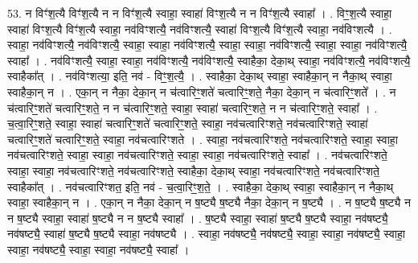 \documentclass[17pt]{extarticle}
\begin{document}
53. न विꣳ॑श॒त्यै विꣳ॑श॒त्यै न न विꣳ॑श॒त्यै स्वाहा॒ स्वाहा॑ विꣳश॒त्यै न न विꣳ॑श॒त्यै स्वाहा᳚ । . विꣳ॒॒श॒त्यै स्वाहा॒ स्वाहा॑ विꣳश॒त्यै विꣳ॑श॒त्यै स्वाहा॒ नव॑विꣳशत्यै॒ नव॑विꣳशत्यै॒ स्वाहा॑ विꣳश॒त्यै विꣳ॑श॒त्यै स्वाहा॒ नव॑विꣳशत्यै । . स्वाहा॒ नव॑विꣳशत्यै॒ नव॑विꣳशत्यै॒ स्वाहा॒ स्वाहा॒ नव॑विꣳशत्यै॒ स्वाहा॒ स्वाहा॒ नव॑विꣳशत्यै॒ स्वाहा॒ स्वाहा॒ नव॑विꣳशत्यै॒ स्वाहा᳚ । . नव॑विꣳशत्यै॒ स्वाहा॒ स्वाहा॒ नव॑विꣳशत्यै॒ नव॑विꣳशत्यै॒ स्वाहैका॒ देका॒थ् स्वाहा॒ नव॑विꣳशत्यै॒ नव॑विꣳशत्यै॒ स्वाहैका᳚त् । . नव॑विꣳशत्या॒ इति॒ नव॑ - विꣳ॒॒श॒त्यै॒ । . स्वाहैका॒ देका॒थ् स्वाहा॒ स्वाहैका॒न् न नैका॒थ् स्वाहा॒ स्वाहैका॒न् न । . एका॒न् न नैका॒ देका॒न् न च॑त्वारिꣳ॒॒शते॑ चत्वारिꣳ॒॒शते॒ नैका॒ देका॒न् न च॑त्वारिꣳ॒॒शते᳚ । . न च॑त्वारिꣳ॒॒शते॑ चत्वारिꣳ॒॒शते॒ न न च॑त्वारिꣳ॒॒शते॒ स्वाहा॒ स्वाहा॑ चत्वारिꣳ॒॒शते॒ न न च॑त्वारिꣳ॒॒शते॒ स्वाहा᳚ । . च॒त्वा॒रिꣳ॒॒शते॒ स्वाहा॒ स्वाहा॑ चत्वारिꣳ॒॒शते॑ चत्वारिꣳ॒॒शते॒ स्वाहा॒ नव॑चत्वारिꣳशते॒ नव॑चत्वारिꣳशते॒ स्वाहा॑ चत्वारिꣳ॒॒शते॑ चत्वारिꣳ॒॒शते॒ स्वाहा॒ नव॑चत्वारिꣳशते । . स्वाहा॒ नव॑चत्वारिꣳशते॒ नव॑चत्वारिꣳशते॒ स्वाहा॒ स्वाहा॒ नव॑चत्वारिꣳशते॒ स्वाहा॒ स्वाहा॒ नव॑चत्वारिꣳशते॒ स्वाहा॒ स्वाहा॒ नव॑चत्वारिꣳशते॒ स्वाहा᳚ । . नव॑चत्वारिꣳशते॒ स्वाहा॒ स्वाहा॒ नव॑चत्वारिꣳशते॒ नव॑चत्वारिꣳशते॒ स्वाहैका॒ देका॒थ् स्वाहा॒ नव॑चत्वारिꣳशते॒ नव॑चत्वारिꣳशते॒ स्वाहैका᳚त् । . नव॑चत्वारिꣳशत॒ इति॒ नव॑ - च॒त्वा॒रिꣳ॒॒श॒ते॒ । . स्वाहैका॒ देका॒थ् स्वाहा॒ स्वाहैका॒न् न नैका॒थ् स्वाहा॒ स्वाहैका॒न् न । . एका॒न् न नैका॒ देका॒न् न ष॒ष्ट्यै ष॒ष्ट्यै नैका॒ देका॒न् न ष॒ष्ट्यै । . न ष॒ष्ट्यै ष॒ष्ट्यै न न ष॒ष्ट्यै स्वाहा॒ स्वाहा॑ ष॒ष्ट्यै न न ष॒ष्ट्यै स्वाहा᳚ । . ष॒ष्ट्यै स्वाहा॒ स्वाहा॑ ष॒ष्ट्यै ष॒ष्ट्यै स्वाहा॒ नव॑षष्ट्यै॒ नव॑षष्ट्यै॒ स्वाहा॑ ष॒ष्ट्यै ष॒ष्ट्यै स्वाहा॒ नव॑षष्ट्यै । . स्वाहा॒ नव॑षष्ट्यै॒ नव॑षष्ट्यै॒ स्वाहा॒ स्वाहा॒ नव॑षष्ट्यै॒ स्वाहा॒ स्वाहा॒ नव॑षष्ट्यै॒ स्वाहा॒ स्वाहा॒ नव॑षष्ट्यै॒ स्वाहा᳚ । \newline
\end{document}
